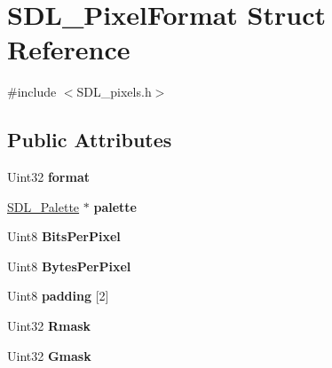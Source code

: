 \hypertarget{struct_s_d_l___pixel_format}{}\section{S\+D\+L\+\_\+\+Pixel\+Format Struct Reference}
\label{struct_s_d_l___pixel_format}


{\ttfamily \#include $<$S\+D\+L\+\_\+pixels.\+h$>$}

\subsection*{Public Attributes}
\begin{DoxyCompactItemize}
\item 
\mbox{\label{struct_s_d_l___pixel_format_a44045e1da843f3d1fad3a608e16af712}} 
Uint32 {\bfseries format}
\item 
\mbox{\label{struct_s_d_l___pixel_format_aeae611aba76f5eb11b696807926c5116}} 
\mbox{\hyperlink{struct_s_d_l___palette}{S\+D\+L\+\_\+\+Palette}} $\ast$ {\bfseries palette}
\item 
\mbox{\label{struct_s_d_l___pixel_format_aac533fae3043ef44df01108248e111d8}} 
Uint8 {\bfseries Bits\+Per\+Pixel}
\item 
\mbox{\label{struct_s_d_l___pixel_format_a6fec9e1809cc3da458d58b8cccd058f2}} 
Uint8 {\bfseries Bytes\+Per\+Pixel}
\item 
\mbox{\label{struct_s_d_l___pixel_format_a1f4e276fbda82e60eaff28f61c7cd19e}} 
Uint8 {\bfseries padding} \mbox{[}2\mbox{]}
\item 
\mbox{\label{struct_s_d_l___pixel_format_a35e5793f6e9c356aec2d130167174946}} 
Uint32 {\bfseries Rmask}
\item 
\mbox{\label{struct_s_d_l___pixel_format_a3d07a81b430202c6ea0089d8df8f4e15}} 
Uint32 {\bfseries Gmask}
\item 
\mbox{\label{struct_s_d_l___pixel_format_ad366812df3ae62edb9ae6cb89234fddb}} 

\end{DoxyCompactItemize}
